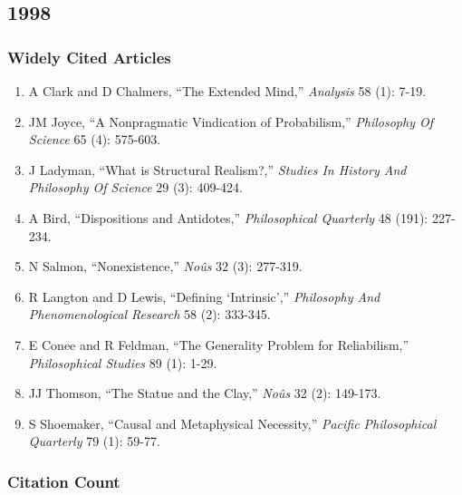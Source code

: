 \documentclass[
  10pt,
  letterpaper,
  DIV=11,
  numbers=noendperiod,
  twoside]{scrartcl}
\providecommand{\tightlist}{%
  \setlength{\itemsep}{0pt}\setlength{\parskip}{0pt}}\usepackage{longtable,booktabs,array}
\begin{document}
\newpage

\subsection{1998}\label{sec-s1998}

\subsubsection*{Widely Cited Articles}\label{widely-cited-articles-22}

\begin{enumerate}
\def\labelenumi{\arabic{enumi}.}
\tightlist
\item
  A Clark and D Chalmers, ``The Extended Mind,'' \emph{Analysis} 58 (1):
  7-19.
\item
  JM Joyce, ``A Nonpragmatic Vindication of Probabilism,''
  \emph{Philosophy Of Science} 65 (4): 575-603.
\item
  J Ladyman, ``What is Structural Realism?,'' \emph{Studies In History
  And Philosophy Of Science} 29 (3): 409-424.
\item
  A Bird, ``Dispositions and Antidotes,'' \emph{Philosophical Quarterly}
  48 (191): 227-234.
\item
  N Salmon, ``Nonexistence,'' \emph{Noûs} 32 (3): 277-319.
\item
  R Langton and D Lewis, ``Defining `Intrinsic','' \emph{Philosophy And
  Phenomenological Research} 58 (2): 333-345.
\item
  E Conee and R Feldman, ``The Generality Problem for Reliabilism,''
  \emph{Philosophical Studies} 89 (1): 1-29.
\item
  JJ Thomson, ``The Statue and the Clay,'' \emph{Noûs} 32 (2): 149-173.
\item
  S Shoemaker, ``Causal and Metaphysical Necessity,'' \emph{Pacific
  Philosophical Quarterly} 79 (1): 59-77.
\end{enumerate}

\subsubsection*{Citation Count}\label{sec-count-1998}
\end{document}
